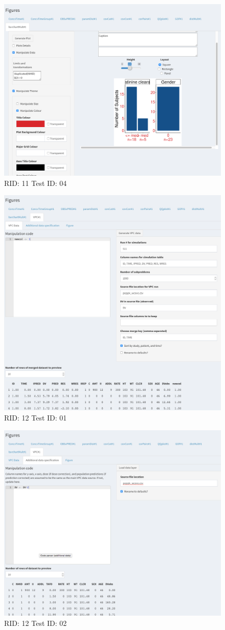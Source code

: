 \begin{figure}[H]
\includegraphics[width=.8\textwidth]{screencaps/11-04-1.png}
\caption{RID: 11 Test ID: 04}
\end{figure}
\begin{figure}[H]
\includegraphics[width=.8\textwidth]{screencaps/12-01-1.png}
\caption{RID: 12 Test ID: 01}
\end{figure}
\begin{figure}[H]
\includegraphics[width=.8\textwidth]{screencaps/12-02-1.png}
\caption{RID: 12 Test ID: 02}
\end{figure}

